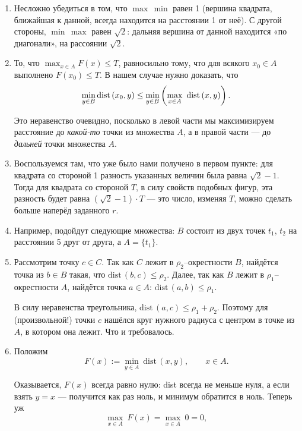 \def\dist{\mathrm{dist}\,} \def\l#1{\limits_{#1}}
\def\Dist{\mathrm{DIST}\,}

\begin{enumerate}

\item Несложно убедиться в том, что $\max\,\min$ равен 1 (вершина квадрата, ближайшая к данной, всегда находится на расстоянии 1 от неё). С другой стороны, $\min\,\max$ равен $\sqrt{2}$: дальняя вершина от данной находится «по диагонали», на рассоянии $\sqrt{2}$.

\item То, что $\max_{x \in A} F(x) \le T$, равносильно тому, что для всякого $x_0 \in A$ выполнено $F(x_0) \le T$. В нашем случае нужно доказать, что
$$\min\l{y \in B} \dist(x_0,y) \le \min\l{y \in B}
	\ll \max\l{x \in A}\ \dist (x,y) \rr.$$

Это неравенство очевидно, посколько в левой части мы максимизируем расстояние до {\itshape какой-то} точки из множества $A$, а в правой части — до {\itshape дальней} точки множества $A$.

\item Воспользуемся там, что уже было нами получено в первом пункте: для квадрата со стороной 1 разность указанных величин была равна $\sqrt 2 -1$. Тогда для квадрата со стороной $T$, в силу свойств подобных фигур, эта разность будет равна $(\sqrt 2 -1) \cdot T$ — это число, изменяя $T$, можно сделать больше наперёд заданного $r$.

\item Например, подойдут следующие множества: $B$ состоит из двух точек $t_1$, $t_2$ на расстоянии 5 друг от друга, а $A = \{ t_1 \}$.

\item Рассмотрим точку $c \in C$. Так как $C$ лежит в $\rho_2$–окрестности $B$, найдётся точка из $b \in B$ такая, что $\dist (b,c) \le \rho_2$. Далее, так как $B$ \linebreak  лежит в $\rho_1$--окрестности $A$, найдётся точка $a \in A$: $\dist (a,b) \le \rho_1$.

В силу неравенства треугольника, $\dist (a,c) \le \rho_1 + \rho_2$. Поэтому для (произвольной!) точки $c$ нашёлся круг нужного радиуса с центром в точке из $A$, в котором она лежит. Что и требовалось.

\item Положим
$$F(x) := \min\l{y \in A}\ \dist (x,y), \qquad x \in A.$$

Оказывается, $F(x)$ всегда равно нулю: dist всегда не меньше нуля, а если взять $y=x$ — получится как раз ноль, и минимум обратится в ноль. Теперь уж
$$\max\l{x\in A}\ F(x) = \max\l{x \in A}\ 0 = 0,$$


\end{enumerate}
